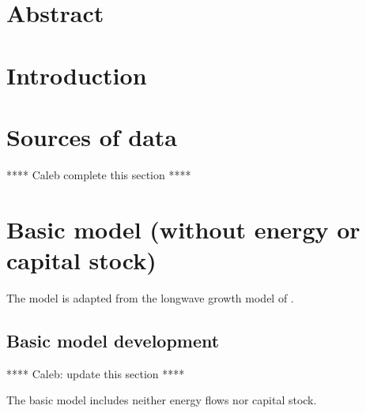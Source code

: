 \documentclass[letterpaper,12pt]{article}
\begin{document}

\section*{Abstract}


\section{Introduction}
\label{sec:Introduction}


\section{Sources of data}
\label{sec:Sources_of_data}

**** Caleb complete this section ****


\section{Basic model (without energy or capital stock)}
\label{sec:Basic_model}

The model is adapted from the longwave growth model of \citet{Jones:2001wn}. 

\subsection{Basic model development}
\label{sec:Basic_model_development}

**** Caleb: update this section ****

The basic model includes neither energy flows nor capital stock.
\end{document}
